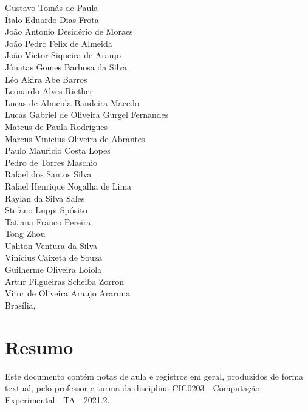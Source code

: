 \documentclass[12pt]{book}
\begin{document}
\begin{titlepage}
\begin{center}
	Gustavo Tomás de Paula\\
	Ítalo Eduardo Dias Frota\\
	João Antonio Desidério de Moraes\\
	João Pedro Felix de Almeida\\
	João Víctor Siqueira de Araujo\\
	Jônatas Gomes Barbosa da Silva\\
	Léo Akira Abe Barros\\
	Leonardo Alves Riether\\
	Lucas de Almeida Bandeira Macedo\\
	Lucas Gabriel de Oliveira Gurgel Fernandes \\
	Mateus de Paula Rodrigues\\
	Marcus Vinicius Oliveira de Abrantes\\
	Paulo Mauricio Costa Lopes\\
	Pedro de Torres Maschio\\
	Rafael dos Santos Silva\\
	Rafael Henrique Nogalha de Lima\\
	Raylan da Silva Sales\\
	Stefano Luppi Spósito\\
	Tatiana Franco Pereira\\
	Tong Zhou\\
	Ualiton Ventura da Silva\\
	Vinícius Caixeta de Souza\\
	Guilherme Oliveira Loiola\\
	Artur Filgueiras Scheiba Zorron\\
	Vitor de Oliveira Araujo Araruna \\
	\vspace{1.5cm}
	{\large Brasília, \DTMnow}
\end{center}
\end{titlepage}
	\printnoidxglossary
	\tableofcontents
	\listoffigures
	\listoftables
	\clearpage
{}


	\chapter*{Resumo}

	Este documento contém notas de aula e registros em geral, produzidos de forma textual, pelo professor e turma da disciplina CIC0203 - Computação Experimental - TA - 2021.2.
	
\end{document}

